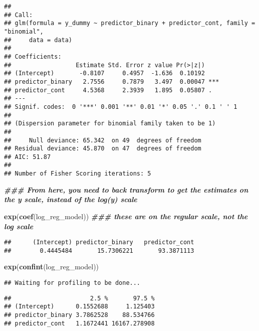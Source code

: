 \documentclass[
]{article}
\newenvironment{Shaded}{\begin{snugshade}}{\end{snugshade}}
\newcommand{\DocumentationTok}[1]{\textcolor[rgb]{0.56,0.35,0.01}{\textbf{\textit{#1}}}}
\newcommand{\FunctionTok}[1]{\textcolor[rgb]{0.13,0.29,0.53}{\textbf{#1}}}
\newcommand{\NormalTok}[1]{#1}
\begin{document}
\begin{verbatim}
## 
## Call:
## glm(formula = y_dummy ~ predictor_binary + predictor_cont, family = "binomial", 
##     data = data)
## 
## Coefficients:
##                  Estimate Std. Error z value Pr(>|z|)    
## (Intercept)       -0.8107     0.4957  -1.636  0.10192    
## predictor_binary   2.7556     0.7879   3.497  0.00047 ***
## predictor_cont     4.5368     2.3939   1.895  0.05807 .  
## ---
## Signif. codes:  0 '***' 0.001 '**' 0.01 '*' 0.05 '.' 0.1 ' ' 1
## 
## (Dispersion parameter for binomial family taken to be 1)
## 
##     Null deviance: 65.342  on 49  degrees of freedom
## Residual deviance: 45.870  on 47  degrees of freedom
## AIC: 51.87
## 
## Number of Fisher Scoring iterations: 5
\end{verbatim}

\begin{Shaded}
\begin{Highlighting}[]
\DocumentationTok{\#\#\# From here, you need to back transform to get the estimates on the y scale, instead of the log(y) scale}

\FunctionTok{exp}\NormalTok{(}\FunctionTok{coef}\NormalTok{(log\_reg\_model)) }\DocumentationTok{\#\#\# these are on the \textquotesingle{}regular\textquotesingle{} scale, not the log scale}
\end{Highlighting}
\end{Shaded}

\begin{verbatim}
##      (Intercept) predictor_binary   predictor_cont 
##        0.4445484       15.7306221       93.3871113
\end{verbatim}

\begin{Shaded}
\begin{Highlighting}[]
\FunctionTok{exp}\NormalTok{(}\FunctionTok{confint}\NormalTok{(log\_reg\_model))}
\end{Highlighting}
\end{Shaded}

\begin{verbatim}
## Waiting for profiling to be done...
\end{verbatim}

\begin{verbatim}
##                      2.5 %       97.5 %
## (Intercept)      0.1552688     1.125403
## predictor_binary 3.7862528    88.534766
## predictor_cont   1.1672441 16167.278908
\end{verbatim}
\end{document}

